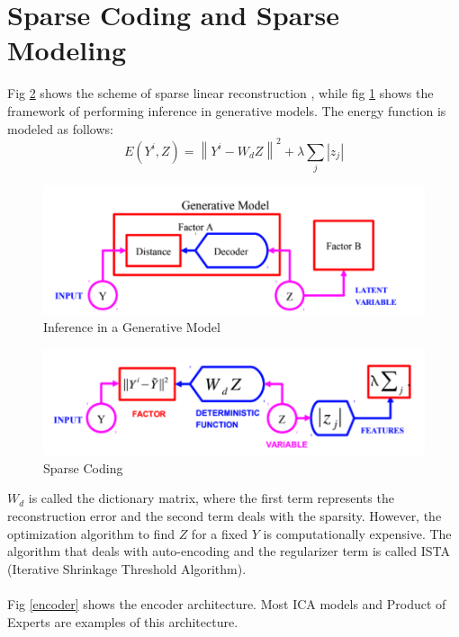 \documentclass[12pt,letterpaper]{article}
\begin{document}
\section*{Sparse Coding and Sparse Modeling}

Fig \ref{fig:sparse} shows the scheme of sparse linear reconstruction \cite{olshausen1997sparse}, while fig \ref{fig:generative} shows the framework of performing inference in generative models.
The energy function is modeled as follows:
\[E\left(Y^{i}, Z\right)=\left\|Y^{i}-W_{d} Z\right\|^{2}+\lambda \sum_{j}\left|z_{j}\right|\]
\begin{figure}[H]
\centering
\includegraphics[width=1.0\linewidth]{generative.png}
\caption{Inference in a Generative Model}
\label{fig:generative}
\end{figure}

\begin{figure}[H]
\centering
\includegraphics[width=1.0\linewidth]{sparse.png}
\caption{Sparse Coding}
\label{fig:sparse}
\end{figure}
$W_d$ is called the dictionary matrix, where the first term represents the reconstruction error and the second term deals with the sparsity. However, the optimization algorithm to find $Z$ for a fixed $Y$ is computationally expensive. The algorithm that deals with auto-encoding and the regularizer term is called ISTA (Iterative Shrinkage Threshold Algorithm). \\
\\
Fig \ref{encoder} shows the encoder architecture. Most ICA models and Product of Experts are examples of this architecture.
\end{document}
